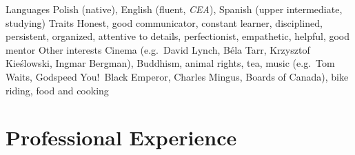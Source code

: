 \begin{sectionlist}
    \sectionlistitem
        {Languages}
        {
            Polish (native),
            English (fluent, \emph{CEA}),
            Spanish (upper intermediate, studying)
        }
    \sectionlistitem
        {Traits}
        {
            Honest, good communicator, constant learner, disciplined,
            persistent, organized, attentive to details, perfectionist,
            empathetic, helpful, good mentor
        }
    \sectionlistitem
        {Other interests}
        {
            Cinema (e.g.~David Lynch, Béla Tarr, Krzysztof Kieślowski, Ingmar
            Bergman), Buddhism, animal rights, tea, music (e.g.~Tom Waits,
            Godspeed You!\ Black Emperor, Charles Mingus, Boards of Canada),
            bike riding, food and cooking
        }
\end{sectionlist}


\section{Professional Experience}

